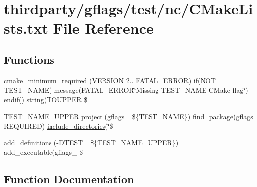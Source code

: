 \hypertarget{thirdparty_2gflags_2test_2nc_2CMakeLists_8txt}{}\section{thirdparty/gflags/test/nc/\+C\+Make\+Lists.txt File Reference}
\label{thirdparty_2gflags_2test_2nc_2CMakeLists_8txt}
\subsection*{Functions}
\begin{DoxyCompactItemize}
\item 
\hyperlink{thirdparty_2gflags_2test_2nc_2CMakeLists_8txt_a9c1a4361385c2981f03892daffd14dc3}{cmake\+\_\+minimum\+\_\+required} (\hyperlink{config_8h_a1c6d5de492ac61ad29aec7aa9a436bbf}{V\+E\+R\+S\+I\+ON} 2.. F\+A\+T\+A\+L\+\_\+\+E\+R\+R\+OR) \hyperlink{thirdparty_2gflags_2test_2CMakeLists_8txt_a102cdd39d1229ea99555942b43b6a137}{if}(N\+OT T\+E\+S\+T\+\_\+\+N\+A\+ME) \hyperlink{CMakeLists_8txt_a5a0e1bdb38f357e7237b7fd6faec9bbc}{message}(F\+A\+T\+A\+L\+\_\+\+E\+R\+R\+OR\char`\"{}Missing T\+E\+S\+T\+\_\+\+N\+A\+ME C\+Make flag\char`\"{}) endif() string(T\+O\+U\+P\+P\+ER \$
\item 
T\+E\+S\+T\+\_\+\+N\+A\+M\+E\+\_\+\+U\+P\+P\+ER \hyperlink{thirdparty_2gflags_2test_2nc_2CMakeLists_8txt_aaaab102ad489901a4186e3e5ceb993a6}{project} (gflags\+\_\+ \$\{T\+E\+S\+T\+\_\+\+N\+A\+ME\}) \hyperlink{CMakeLists_8txt_a04fb5360b7c5ec61901f22d43156f47a}{find\+\_\+package}(\hyperlink{ChangeLog_8txt_a47628157e24b2f95754a29dd48dfe48e}{gflags} R\+E\+Q\+U\+I\+R\+ED) \hyperlink{thirdparty_2gflags_2test_2CMakeLists_8txt_a667ad27fbd5d1052dedd4736401ec6fb}{include\+\_\+directories}(\char`\"{}\$
\item 
\hyperlink{thirdparty_2gflags_2test_2nc_2CMakeLists_8txt_a729acfea96c5dae3fa99344ccc2507e1}{add\+\_\+definitions} (-\/D\+T\+E\+S\+T\+\_\+ \$\{T\+E\+S\+T\+\_\+\+N\+A\+M\+E\+\_\+\+U\+P\+P\+ER\}) add\+\_\+executable(gflags\+\_\+ \$
\end{DoxyCompactItemize}


\subsection{Function Documentation}
